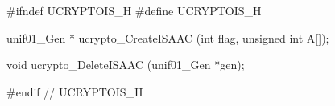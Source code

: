 #ifndef UCRYPTOIS_H
#define UCRYPTOIS_H

unif01_Gen * ucrypto_CreateISAAC (int flag, unsigned int A[]);

void ucrypto_DeleteISAAC (unif01_Gen *gen);

#endif // UCRYPTOIS_H